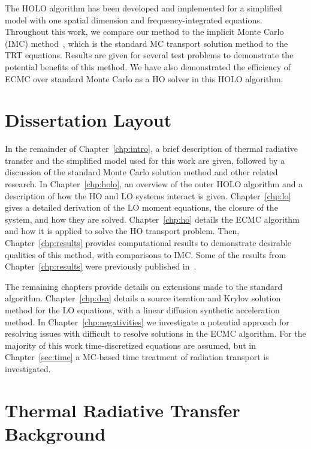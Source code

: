 The HOLO algorithm has been
developed and implemented for a simplified model with one spatial dimension and
frequency-integrated equations. Throughout this work, we compare our
method to the implicit Monte Carlo (IMC) method~\cite{fnc}, which is the standard MC
transport solution method to the TRT equations.  Results are given for several test
problems to demonstrate the potential benefits of this method.  We have also demonstrated the efficiency of ECMC over standard Monte Carlo
as a HO solver in this HOLO algorithm.

\section{Dissertation Layout}


In the remainder of Chapter~\ref{chp:intro},  a brief description of thermal radiative transfer and the simplified model used
 for this work are given, followed by a discussion of the standard Monte Carlo
solution method and other related research.  
In Chapter~\ref{chp:holo}, an overview of the outer HOLO algorithm and a description of
how the HO and LO systems interact is given.
Chapter~\ref{chp:lo} gives a detailed derivation of the LO moment
equations, the closure of the system, and how they are solved. 
Chapter~\ref{chp:ho} details the ECMC algorithm and how it is applied to solve the HO transport problem.
Then, Chapter~\ref{chp:results} provides computational results to demonstrate desirable
qualities of this method, with comparisons to IMC.  Some of the results from
Chapter~\ref{chp:results} were previously published
in~\cite{bolding_nse}.

The remaining chapters provide details on extensions made to the standard algorithm.
Chapter~\ref{chp:dsa} details a source iteration and Krylov solution method for the LO
equations, with a linear diffusion synthetic acceleration method.  In
Chapter~\ref{chp:negativities} we investigate a potential approach for resolving issues
with difficult to resolve solutions in the ECMC algorithm.
For the majority of this work time-discretized equations are assumed, but in
Chapter~\ref{sec:time} a MC-based time treatment of radiation transport is investigated.



\section{Thermal Radiative Transfer Background}

